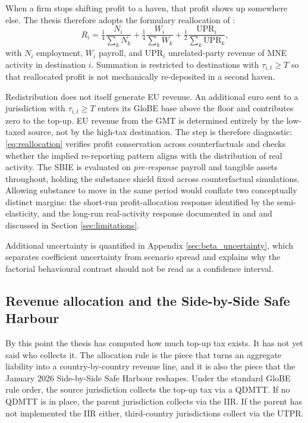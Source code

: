 \documentclass[11pt,a4paper]{article}
\begin{document}
When a firm stops shifting profit to a haven, that profit shows up somewhere else. The thesis therefore adopts the formulary reallocation of \citet{garcia-bernardo2024}:
\begin{equation}\label{eq:reallocation}
R_i = \tfrac{1}{4}\frac{N_i}{\sum_{k} N_k} + \tfrac{1}{4}\frac{W_i}{\sum_{k} W_k} + \tfrac{1}{2}\frac{\text{UPR}_i}{\sum_{k} \text{UPR}_k},
\end{equation}
with $N_i$ employment, $W_i$ payroll, and $\text{UPR}_i$ unrelated-party revenue of MNE activity in destination $i$. Summation is restricted to destinations with $\tau_{i,t} \geq T$ so that reallocated profit is not mechanically re-deposited in a second haven.

Redistribution does not itself generate EU revenue. An additional euro sent to a jurisdiction with $\tau_{i,t}\ge T$ enters its GloBE base above the floor and contributes zero to the top-up. EU revenue from the GMT is determined entirely by the low-taxed source, not by the high-tax destination. The step is therefore diagnostic: \eqref{eq:reallocation} verifies profit conservation across counterfactuals and checks whether the implied re-reporting pattern aligns with the distribution of real activity. The SBIE is evaluated on \emph{pre-response} payroll and tangible assets throughout, holding the substance shield fixed across counterfactual simulations. Allowing substance to move in the same period would conflate two conceptually distinct margins: the short-run profit-allocation response identified by the semi-elasticity, and the long-run real-activity response documented in \citet{bilicka2022} and \citet{suarezserrato2018} and discussed in Section \ref{sec:limitations}.

Additional uncertainty is quantified in Appendix \ref{sec:beta_uncertainty}, which separates coefficient uncertainty from scenario spread and explains why the factorial behavioural contrast should not be read as a confidence interval.

\subsection{Revenue allocation and the Side-by-Side Safe Harbour}\label{sec:sbs}\label{sec:jan2026}

By this point the thesis has computed how much top-up tax exists. It has not yet said who collects it. The allocation rule is the piece that turns an aggregate liability into a country-by-country revenue line, and it is also the piece that the January 2026 Side-by-Side Safe Harbour reshapes. Under the standard GloBE rule order, the source jurisdiction collects the top-up tax via a QDMTT. If no QDMTT is in place, the parent jurisdiction collects via the IIR. If the parent has not implemented the IIR either, third-country jurisdictions collect via the UTPR.
\end{document}
